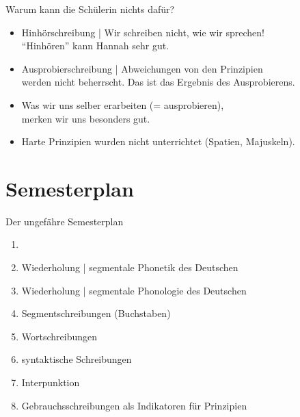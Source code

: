 \begin{frame}
  {Warum kann die Schülerin nichts dafür?}
  \begin{itemize}[<+->]
    \item \alert{Hinhörschreibung} | Wir schreiben nicht, wie wir sprechen!\\
      "`Hinhören"' kann Hannah sehr gut.
      \Zeile
    \item \alert{Ausprobierschreibung} | \alert{Abweichungen von den Prinzipien}\\
      werden nicht beherrscht. Das ist das Ergebnis des Ausprobierens.
    \item Was wir uns selber erarbeiten (= ausprobieren),\\
      merken wir uns besonders gut.
      \Zeile
    \item Harte Prinzipien wurden nicht unterrichtet (Spatien, Majuskeln).
  \end{itemize}
\end{frame}

\section{Semesterplan}

\begin{frame}
  {Der ungefähre Semesterplan}
  \begin{enumerate}[<+->]
    \item 
    \item Wiederholung | segmentale Phonetik des Deutschen
    \item Wiederholung | segmentale Phonologie des Deutschen
    \item Segmentschreibungen (Buchstaben)
    \item Wortschreibungen
    \item syntaktische Schreibungen
    \item Interpunktion
    \item Gebrauchsschreibungen als Indikatoren für Prinzipien
  \end{enumerate}
\end{frame}
